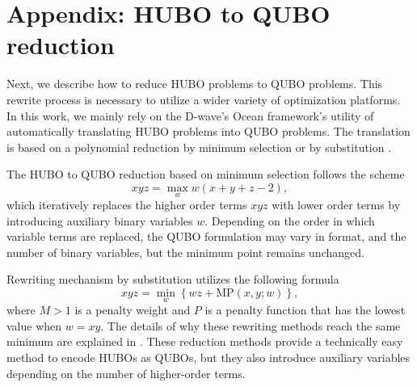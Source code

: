 \section{Appendix: HUBO to QUBO reduction}

Next, we describe how to reduce HUBO problems to QUBO problems. This rewrite process is necessary to utilize a wider variety of optimization platforms. In this work, we mainly rely on the D-wave's Ocean framework's utility of automatically translating HUBO problems into QUBO problems. The translation is based on a polynomial reduction by minimum selection or by substitution \cite{polynomial_reductions}.

The HUBO to QUBO reduction based on minimum selection \cite{polynomial_reductions} follows the scheme
\begin{equation*}
    xyz = \max_{w}w(x+y+z-2),
\end{equation*}
which iteratively replaces the higher order terms $xyz$ with lower order terms by introducing auxiliary binary variables $w$. Depending on the order in which variable terms are replaced, the QUBO formulation may vary in format, and the number of binary variables, but the minimum point remains unchanged.

Rewriting mechanism by substitution utilizes the following formula
\begin{equation*}
    xyz = \min_{w}\left\{wz + \mathrm{MP}(x, y ; w)\right\},
\end{equation*}
where $M > 1$  is a penalty weight and $P$ is a penalty function that has the lowest value when $w = xy$. The details of why these rewriting methods reach the same minimum are explained in \cite{polynomial_reductions}. These reduction methods provide a technically easy method to encode HUBOs as QUBOs, but they also introduce auxiliary variables depending on the number of higher-order terms.